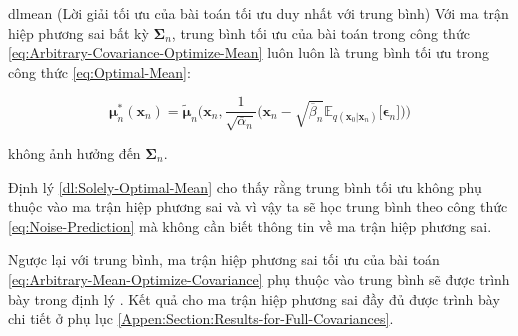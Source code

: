 \documentclass[14pt, a4paper]{article}
\numberwithin{equation}{section}
\numberwithin{figure}{section}
\numberwithin{dl}{section}
\numberwithin{md}{section}
\numberwithin{bd}{section}
\numberwithin{dn}{section}
\numberwithin{hq}{section}
\begin{document}
    \begin{restatable}{dl}{mean} \label{dl:Solely-Optimal-Mean}
        (Lời giải tối ưu của bài toán tối ưu duy nhất với trung bình)
        Với ma trận hiệp phương sai bất kỳ $\boldsymbol{\Sigma}_n$,
        trung bình tối ưu của bài toán trong công thức \ref{eq:Arbitrary-Covariance-Optimize-Mean} luôn luôn là trung bình tối ưu trong công thức \ref{eq:Optimal-Mean}:

        \begin{equation*}
            \boldsymbol{\mu}_n^{\ast} (\boldsymbol{x}_n)=\tilde{\boldsymbol{\mu}}_n \Bigg( \boldsymbol{x}_n, \dfrac{1}{\sqrt{\overline{\alpha}_n}} \Big( \boldsymbol{x}_n - \sqrt{\overline{\beta}_n} \mathbb{E}_{q(\boldsymbol{x}_0 \vert \boldsymbol{x}_n)} \lbrack \boldsymbol{\epsilon}_n \rbrack \Big) \Bigg)
        \end{equation*}

        không ảnh hưởng đến $\boldsymbol{\Sigma}_n$.
    \end{restatable}

    Định lý \ref{dl:Solely-Optimal-Mean} cho thấy rằng trung bình tối ưu không phụ thuộc vào ma trận hiệp phương sai và vì vậy ta sẽ học trung bình theo công thức \ref{eq:Noise-Prediction} mà không cần biết thông tin về ma trận hiệp phương sai.

    Ngược lại với trung bình, ma trận hiệp phương sai tối ưu của bài toán \ref{eq:Arbitrary-Mean-Optimize-Covariance} phụ thuộc vào trung bình sẽ được trình bày trong định lý .
    Kết quả cho ma trận hiệp phương sai đầy đủ được trình bày chi tiết ở phụ lục \ref{Appen:Section:Results-for-Full-Covariances}.
\end{document}

